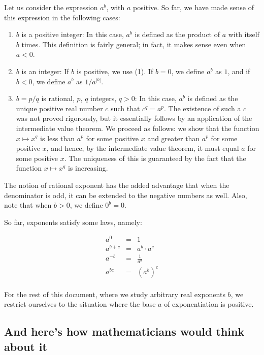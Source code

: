 \documentclass[10pt]{amsart}
\begin{document}
Let us consider the expression $a^b$, with $a$ positive. So far, we
have made sense of this expression in the following cases:

\begin{enumerate}
\item $b$ is a positive integer: In this case, $a^b$ is defined as the
  product of $a$ with itself $b$ times. This definition is fairly
  general; in fact, it makes sense even when $a < 0$.
\item $b$ is an integer: If $b$ is positive, we use (1). If $b = 0$,
  we define $a^b$ as $1$, and if $b < 0$, we define $a^b$ as
  $1/a^{|b|}$.
\item $b = p/q$ is rational, $p$, $q$ integers, $q > 0$: In this case,
  $a^b$ is defined as the unique positive real number $c$ such that
  $c^q = a^p$.  The existence of such a $c$ was not proved rigorously,
  but it essentially follows by an application of the intermediate
  value theorem. We proceed as follows: we show that the function $x
  \mapsto x^q$ is less than $a^p$ for some positive $x$ and greater
  than $a^p$ for some positive $x$, and hence, by the intermediate
  value theorem, it must equal $a$ for some positive $x$. The
  uniqueness of this is guaranteed by the fact that the function $x
  \mapsto x^q$ is increasing.
\end{enumerate}

The notion of rational exponent has the added advantage that when the
denominator is odd, it can be extended to the negative numbers as
well. Also, note that when $b > 0$, we define $0^b = 0$.

So far, exponents satisfy some laws, namely:

\begin{eqnarray*}
  a^0 & = & 1 \\
  a^{b + c} & = & a^b \cdot a^c \\
  a^{-b} & = & \frac{1}{a^b}\\
  a^{bc} & = & (a^b)^c \\
\end{eqnarray*}

For the rest of this document, where we study arbitrary real exponents
$b$, we restrict ourselves to the situation where the base $a$ of
exponentiation is positive.

\subsection{And here's how mathematicians would think about it}
\end{document}
